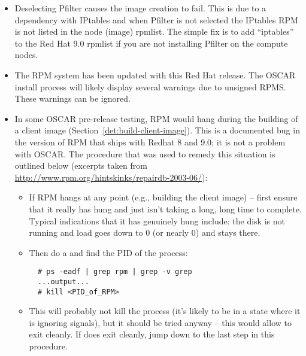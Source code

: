 \begin{itemize}

\item Deselecting Pfilter causes the image creation to fail.  This is
  due to a dependency with IPtables and when Pfilter is not selected
  the IPtables RPM is not listed in the node (image) rpmlist.   The simple
  fix is to add ``iptables'' to the Red Hat 9.0 rpmlist if you are not
  installing Pfilter on the compute nodes.

\item The RPM system has been updated with this Red Hat release.  The
 OSCAR install process will likely display several warnings due to unsigned
 RPMS.  These warnings can be ignored. 

\item In some OSCAR pre-release testing, RPM would hang during the
  building of a client image (Section~\ref{det:build-client-image}).
  This is a documented bug in the version of RPM that ships with
  Redhat 8 and 9.0; it is not a problem with OSCAR.  The procedure
  that was used to remedy this situation is outlined below (excerpts
  taken from \url{http://www.rpm.org/hintskinks/repairdb-2003-06/}):
        \begin{itemize}
        \item If RPM hangs at any point (e.g., building the client
          image) -- first ensure that it really has hung and just
          isn't taking a long, long time to complete.  Typical
          indications that it has genuinely hung include: the disk is
          not running and load goes down to 0 (or nearly 0) and stays
          there.
          
        \item Then do a  and find the PID of the 
          process:
\begin{verbatim}
  # ps -eadf | grep rpm | grep -v grep
  ...output...
  # kill <PID_of_RPM>
\end{verbatim}
          
        \item This will probably not kill the process (it's likely to
          be in a state where it is ignoring signals), but it should
          be tried anyway -- this would allow  to exit
          cleanly.  If  does exit cleanly, jump down to the
          last step in this procedure.
          

\end{itemize}
\end{itemize}
